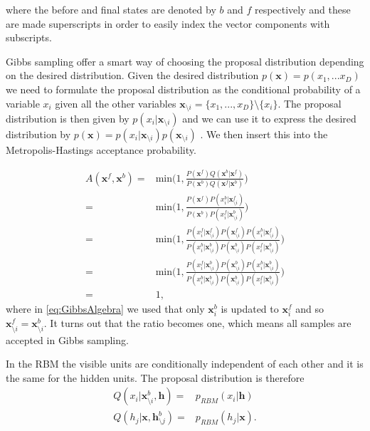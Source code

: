 \documentclass[twoside,english]{uiofysmaster}
\begin{document}
where the before and final states are denoted by $b$ and $f$ respectively and these are made superscripts in order to easily index the vector components with subscripts.

Gibbs sampling offer a smart way of choosing the proposal distribution depending on the desired distribution. Given the desired distribution $p(\bm{x}) = p(x_1, ...x_D)$ we need to formulate the proposal distribution as the conditional probability of a variable $x_i$ given all the other variables $\bm{x}_{\setminus i} = \{ x_1, ..., x_D \} \setminus \{x_i\}$.
The proposal distribution is then given by $p(x_i | \bm{x}_{\setminus i})$ and we can use it to express the desired distribution by $p(\bm{x}) = p(x_i | \bm{x}_{\setminus i}) p(\bm{x}_{\setminus i})$ . We then insert this into the Metropolis-Hastings acceptance probability. 

\begin{align}
	A(\bm{x}^f, \bm{x}^b) =& \text{min} \Big(1,  \frac{  P(\bm{x}^f) Q(\bm{x}^b| \bm{x}^f) }
	{  P(\bm{x}^b) Q(\bm{x}^f| \bm{x}^b)  }  \Big) \\
	=& \text{min} \Big(1,  \frac{  P(\bm{x}^f) P(x_i^b| \bm{x}_{\setminus i}^f) }
	{  P(\bm{x}^b) P(x_i^f| \bm{x}_{\setminus i}^b)  }  \Big) \\
	=& \text{min} \Big(1,  \frac{ P(x_i^f| \bm{x}_{\setminus i}^f)  P(\bm{x}_{\setminus i}^f) P(x_i^b| \bm{x}_{\setminus i}^f) }
	{   P(x_i^b| \bm{x}_{\setminus i}^b) P(\bm{x}_{\setminus i}^b) P(x_i^f| \bm{x}_{\setminus i}^b)  }  \Big) \\
	=& \text{min} \Big(1,  \frac{ P(x_i^f| \bm{x}_{\setminus i}^b)  P(\bm{x}_{\setminus i}^b) P(x_i^b| \bm{x}_{\setminus i}^b) }
	{   P(x_i^b| \bm{x}_{\setminus i}^b) P(\bm{x}_{\setminus i}^b) P(x_i^f| \bm{x}_{\setminus i}^b)  }  \Big) \\ \label{eq:GibbsAlgebra}
	=& 1,
\end{align}
where in \ref{eq:GibbsAlgebra} we used that only $\bm{x}_i^b$ is updated to $\bm{x}_i^f$ and so $\bm{x}_{\setminus i}^f = \bm{x}_{\setminus i}^b$. It turns out that the ratio becomes one, which means all samples are accepted in Gibbs sampling.

In the RBM the visible units are conditionally independent of each other and it is the same for the hidden units. The proposal distribution is therefore
\begin{align}
	Q(x_i | \bm{x}_{\setminus i}^b, \bm{h}) =& p_{RBM} (x_i |\bm{h}) \\
	Q(h_j | \bm{x}, \bm{h}_{\setminus j}^b) =& p_{RBM} (h_j |\bm{x}). 
\end{align}
\end{document}
